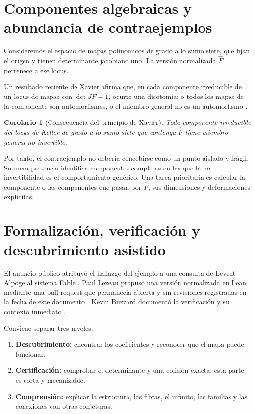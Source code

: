 \documentclass[11pt]{article}
\newtheorem{corollary}[theorem]{Corolario}
\theoremstyle{definition}
\theoremstyle{remark}
\begin{document}
\section{Componentes algebraicas y abundancia de contraejemplos}

Consideremos el espacio de mapas polin\'omicos de grado a lo sumo siete, que
fijan el origen y tienen determinante jacobiano uno. La versi\'on normalizada
$\widehat F$ pertenece a ese locus.

Un resultado reciente de Xavier afirma que, en cada componente irreducible de
un locus de mapas con $\det JF=1$, ocurre una dicotom\'ia: o todos los mapas de
la componente son automorfismos, o el miembro general no es un automorfismo
\cite{Xavier2026}.

\begin{corollary}[Consecuencia del principio de Xavier]
Toda componente irreducible del locus de Keller de grado a lo sumo siete que
contenga $\widehat F$ tiene miembro general no invertible.
\end{corollary}

Por tanto, el contraejemplo no deber\'ia concebirse como un punto aislado y
fr\'agil. Su mera presencia identifica componentes completas en las que la no
invertibilidad es el comportamiento gen\'erico. Una tarea prioritaria es
calcular la componente o las componentes que pasan por $\widehat F$, sus
dimensiones y deformaciones expl\'icitas.

\section{Formalizaci\'on, verificaci\'on y descubrimiento asistido}

El anuncio p\'ublico atribuy\'o el hallazgo del ejemplo a una consulta de Levent
Alp\"oge al sistema Fable \cite{AlpogeAnnouncement2026}. Paul Lezeau propuso
una versi\'on normalizada en Lean mediante una pull request que permanec\'ia
abierta y sin revisiones registradas en la fecha de este documento
\cite{LezeauLean2026}. Kevin Buzzard document\'o la verificaci\'on y su contexto inmediato
\cite{Buzzard2026}.

Conviene separar tres niveles:

\begin{enumerate}
\item \textbf{Descubrimiento:} encontrar los coeficientes y reconocer que el
mapa puede funcionar.
\item \textbf{Certificaci\'on:} comprobar el determinante y una colisi\'on
exacta; esta parte es corta y mecanizable.
\item \textbf{Comprensi\'on:} explicar la estructura, las fibras, el infinito,
las familias y las conexiones con otras conjeturas.
\end{enumerate}
\end{document}
